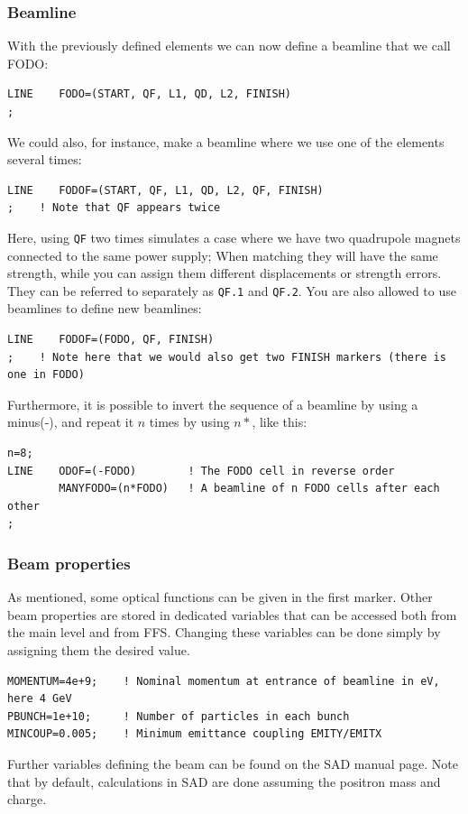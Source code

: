 \documentclass{article}
\begin{document}
\subsubsection{Beamline}
With the previously defined elements we can now define a beamline that we call FODO:
\begin{lstlisting}
LINE    FODO=(START, QF, L1, QD, L2, FINISH)
;
\end{lstlisting}
We could also, for instance, make a beamline where we use one of the elements several times:
\begin{lstlisting}
LINE    FODOF=(START, QF, L1, QD, L2, QF, FINISH)
;    ! Note that QF appears twice
\end{lstlisting}
Here, using \texttt{QF} two times simulates a case where we have two quadrupole magnets connected to the same power supply; When matching they will have the same strength, while you can assign them different displacements or strength errors. They can be referred to separately as \texttt{QF.1} and \texttt{QF.2}. You are also allowed to use beamlines to define new beamlines:
\begin{lstlisting}
LINE    FODOF=(FODO, QF, FINISH)
;    ! Note here that we would also get two FINISH markers (there is one in FODO)
\end{lstlisting}
%
Furthermore, it is possible to invert the sequence of a beamline by using a minus(-), and repeat it $n$ times by using $n*$, like this:
\begin{lstlisting}
n=8;
LINE    ODOF=(-FODO)        ! The FODO cell in reverse order
        MANYFODO=(n*FODO)   ! A beamline of n FODO cells after each other
;
\end{lstlisting}


\subsubsection{Beam properties}
As mentioned, some optical functions can be given in the first marker. Other beam properties are stored in dedicated variables that can be accessed both from the main level and from FFS. Changing these variables can be done simply by assigning them the desired value.
\begin{lstlisting}
MOMENTUM=4e+9;    ! Nominal momentum at entrance of beamline in eV, here 4 GeV
PBUNCH=1e+10;     ! Number of particles in each bunch
MINCOUP=0.005;    ! Minimum emittance coupling EMITY/EMITX
\end{lstlisting}
Further variables defining the beam can be found on the SAD manual page. Note that by default, calculations in SAD are done assuming the positron mass and charge.
\end{document}
